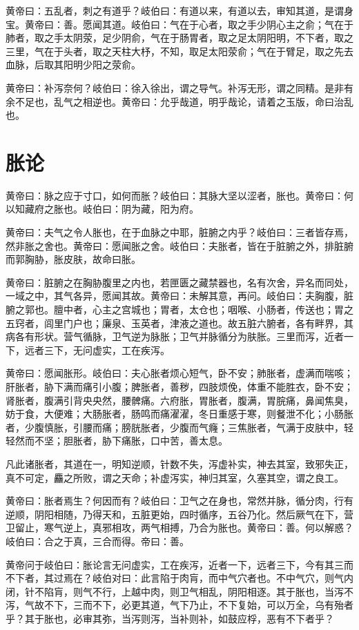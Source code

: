 \documentclass[a4paper,12pt,UTF8,twoside]{ctexbook}
\begin{document}
	黄帝曰：五乱者，刺之有道乎？岐伯曰：有道以来，有道以去，审知其道，是谓身宝。黄帝曰：善。愿闻其道。岐伯曰：气在于心者，取之手少阴心主之俞；气在于肺者，取之手太阴荥，足少阴俞，气在于肠胃者，取之足太阴阳明，不下者，取之三里，气在于头者，取之天柱大杼，不知，取足太阳荥俞；气在于臂足，取之先去血脉，后取其阳明少阳之荥俞。
	
	黄帝曰：补泻奈何？岐伯曰：徐入徐出，谓之导气。补泻无形，谓之同精。是非有余不足也，乱气之相逆也。黄帝曰：允乎哉道，明乎哉论，请着之玉版，命曰治乱也。
	\chapter{胀论}
	
	黄帝曰：脉之应于寸口，如何而胀？岐伯曰：其脉大坚以涩者，胀也。黄帝曰：何以知藏府之胀也。岐伯曰：阴为藏，阳为府。
	
	黄帝曰：夫气之令人胀也，在于血脉之中耶，脏腑之内乎？岐伯曰：三者皆存焉，然非胀之舍也。黄帝曰：愿闻胀之舍。岐伯曰：夫胀者，皆在于脏腑之外，排脏腑而郭胸胁，胀皮肤，故命曰胀。
	
	黄帝曰：脏腑之在胸胁腹里之内也，若匣匮之藏禁器也，名有次舍，异名而同处，一域之中，其气各异，愿闻其故。黄帝曰：未解其意，再问。岐伯曰：夫胸腹，脏腑之郭也。膻中者，心主之宫城也；胃者，太仓也；咽喉、小肠者，传送也；胃之五窍者，闾里门户也；廉泉、玉英者，津液之道也。故五脏六腑者，各有畔界，其病各有形状。营气循脉，卫气逆为脉胀；卫气并脉循分为肤胀。三里而泻，近者一下，远者三下，无问虚实，工在疾泻。
	
	黄帝曰：愿闻胀形。岐伯曰：夫心胀者烦心短气，卧不安；肺胀者，虚满而喘咳；肝胀者，胁下满而痛引小腹；脾胀者，善秽，四肢烦俛，体重不能胜衣，卧不安；肾胀者，腹满引背央央然，腰髀痛。六府胀，胃胀者，腹满，胃脘痛，鼻闻焦臭，妨于食，大便难；大肠胀者，肠鸣而痛濯濯，冬日重感于寒，则餐泄不化；小肠胀者，少腹慎胀，引腰而痛；膀胱胀者，少腹而气癃；三焦胀者，气满于皮肤中，轻轻然而不坚；胆胀者，胁下痛胀，口中苦，善太息。
	
	凡此诸胀者，其道在一，明知逆顺，针数不失，泻虚补实，神去其室，致邪失正，真不可定，麤之所败，谓之天命；补虚泻实，神归其室，久塞其空，谓之良工。
	
	黄帝曰：胀者焉生？何因而有？岐伯曰：卫气之在身也，常然并脉，循分肉，行有逆顺，阴阳相随，乃得天和，五脏更始，四时循序，五谷乃化。然后厥气在下，营卫留止，寒气逆上，真邪相攻，两气相搏，乃合为胀也。黄帝曰：善。何以解惑？岐伯曰：合之于真，三合而得。帝曰：善。
	
	黄帝问于岐伯曰：胀论言无问虚实，工在疾泻，近者一下，远者三下，今有其三而不下者，其过焉在？岐伯对曰：此言陷于肉肓，而中气穴者也。不中气穴，则气内闭，针不陷肓，则气不行，上越中肉，则卫气相乱，阴阳相逐。其于胀也，当泻不泻，气故不下，三而不下，必更其道，气下乃止，不下复始，可以万全，乌有殆者乎？其于胀也，必审其弥，当泻则泻，当补则补，如鼓应桴，恶有不下者乎？
\end{document}
